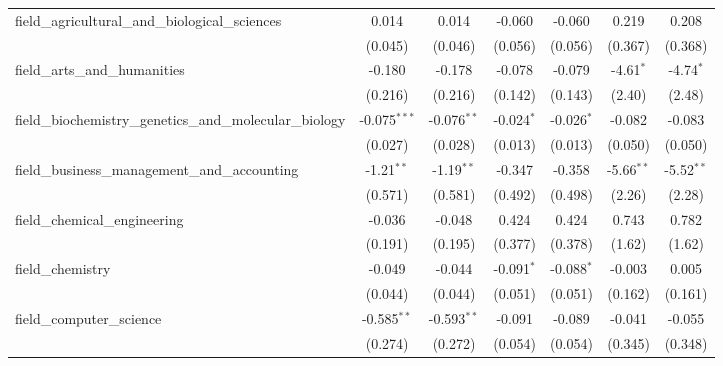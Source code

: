 \begin{tabular}{lcccccc}
   field\_agricultural\_and\_biological\_sciences              & 0.014          & 0.014         & -0.060        & -0.060        & 0.219         & 0.208\\   
                                                               & (0.045)        & (0.046)       & (0.056)       & (0.056)       & (0.367)       & (0.368)\\   
   field\_arts\_and\_humanities                                & -0.180         & -0.178        & -0.078        & -0.079        & -4.61$^{*}$   & -4.74$^{*}$\\   
                                                               & (0.216)        & (0.216)       & (0.142)       & (0.143)       & (2.40)        & (2.48)\\   
   field\_biochemistry\_genetics\_and\_molecular\_biology      & -0.075$^{***}$ & -0.076$^{**}$ & -0.024$^{*}$  & -0.026$^{*}$  & -0.082        & -0.083\\   
                                                               & (0.027)        & (0.028)       & (0.013)       & (0.013)       & (0.050)       & (0.050)\\   
   field\_business\_management\_and\_accounting                & -1.21$^{**}$   & -1.19$^{**}$  & -0.347        & -0.358        & -5.66$^{**}$  & -5.52$^{**}$\\   
                                                               & (0.571)        & (0.581)       & (0.492)       & (0.498)       & (2.26)        & (2.28)\\   
   field\_chemical\_engineering                                & -0.036         & -0.048        & 0.424         & 0.424         & 0.743         & 0.782\\   
                                                               & (0.191)        & (0.195)       & (0.377)       & (0.378)       & (1.62)        & (1.62)\\   
   field\_chemistry                                            & -0.049         & -0.044        & -0.091$^{*}$  & -0.088$^{*}$  & -0.003        & 0.005\\   
                                                               & (0.044)        & (0.044)       & (0.051)       & (0.051)       & (0.162)       & (0.161)\\   
   field\_computer\_science                                    & -0.585$^{**}$  & -0.593$^{**}$ & -0.091        & -0.089        & -0.041        & -0.055\\   
                                                               & (0.274)        & (0.272)       & (0.054)       & (0.054)       & (0.345)       & (0.348)\\   

\end{tabular}
